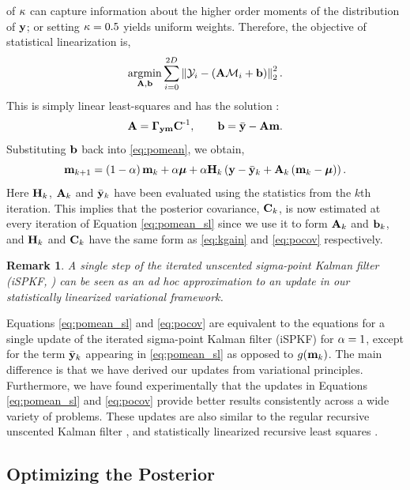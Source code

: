 \documentclass{article} %
\newtheorem{remark}{Remark}
\begin{document}
of $\scoef$ can capture information about the higher order moments of the
distribution of $\obs$; or setting $\scoef = 0.5$ yields uniform weights.
Therefore, the objective of statistical linearization is,
\begin{equation}
    \argmin_{\Linmat, \intcpt} \sum^{2D}_{i=0} 
        \lnorm{2}{\Sobs_i - \brac{\Linmat\Sfunc_i + \intcpt}}^2.
\end{equation}
This is simply linear least-squares and has the solution \cite{Geist2010}:
\begin{equation}
    \Linmat = \xcov \pocov\inv, \qquad
    \intcpt = \bar\obs - \Linmat\pomean.
\end{equation}
Substituting $\intcpt$ back into \eqref{eq:pomean}, we obtain, 
\begin{equation}
    \pomean_{k+1} = \brac{1-\step}\pomean_k + \step\prmean 
        + \step\Kgain_k\brac{\obs - \bar\obs_k 
        + \Linmat_k\brac{\pomean_k - \prmean}}.
    \label{eq:pomean_sl}
\end{equation}
Here $\Kgain_k$, $\Linmat_k$ and $\bar\obs_k$ have been evaluated using the
statistics from the $k$th iteration. This implies that the posterior
covariance, $\pocov_k$, is now estimated at every iteration of Equation
\eqref{eq:pomean_sl} since we use it to form $\Linmat_k$ and $\intcpt_k$, and 
$\Kgain_k$ and $\pocov_k$ have the same form as \eqref{eq:kgain} and
\eqref{eq:pocov} respectively. 
%
\begin{remark}
A single step of the  iterated unscented sigma-point Kalman filter (iSPKF,
\cite{Sibley2006}) can be seen as an ad hoc approximation to an update in our
statistically linearized variational framework. 
\end{remark}

Equations \eqref{eq:pomean_sl} and \eqref{eq:pocov} are equivalent to the
equations for a single update of the iterated sigma-point Kalman filter (iSPKF)
for $\step = 1$, except for the term $\bar\obs_k$ appearing in
\eqref{eq:pomean_sl} as opposed to $\nonlin{\pomean_k}$. The main difference is
that we have derived our updates from  variational principles.  Furthermore, we
have found experimentally that the updates in Equations \eqref{eq:pomean_sl}
and \eqref{eq:pocov} provide better results consistently across a wide variety
of problems.
%
These updates  are also similar to the regular recursive unscented Kalman
filter \cite{Julier2004}, and statistically linearized recursive least squares
\cite{Geist2010}.


\subsection{Optimizing the Posterior}
\end{document}
